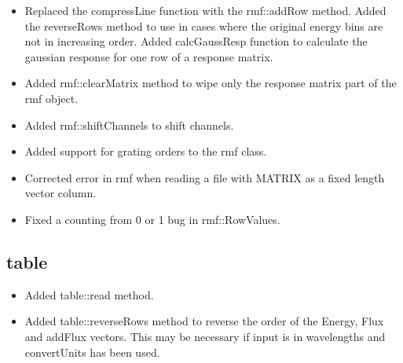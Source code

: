 \documentclass[11pt]{book}
\begin{document}
\begin{itemize}

\item Replaced the compressLine function with the rmf::addRow
  method. Added the reverseRows method to use in cases where the
  original energy bins are not in increasing order. Added
  calcGaussResp function to calculate the gaussian response for one
  row of a response matrix.

\item Added rmf::clearMatrix method to wipe only the response matrix
  part of the rmf object.

\item Added rmf::shiftChannels to shift channels.

\item Added support for grating orders to the rmf class.

\item Corrected error in rmf when reading a file with MATRIX as a
  fixed length vector column.

\item Fixed a counting from 0 or 1 bug in rmf::RowValues.

\end{itemize}

\subsection{table}

\begin{itemize}

\item Added table::read method.

\item Added table::reverseRows method to reverse the order of the
  Energy, Flux and addFlux vectors. This may be necessary if input is in
  wavelengths and convertUnits has been used.

\end{itemize}
\end{document}
